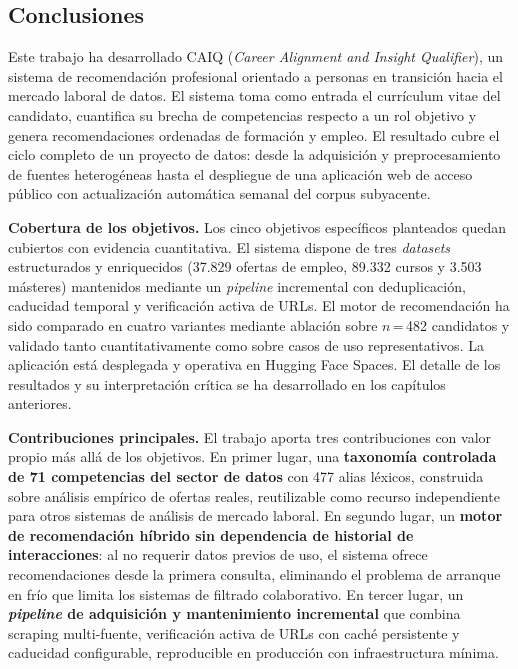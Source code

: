 
\subsection{Conclusiones}
\label{subsec:conclusiones}

Este trabajo ha desarrollado CAIQ (\textit{Career Alignment and Insight Qualifier}),
un sistema de recomendación profesional orientado a personas en transición hacia el
mercado laboral de datos. El sistema toma como entrada el currículum vitae del candidato,
cuantifica su brecha de competencias respecto a un rol objetivo y genera recomendaciones
ordenadas de formación y empleo. El resultado cubre el ciclo completo de un proyecto de
datos: desde la adquisición y preprocesamiento de fuentes heterogéneas hasta el despliegue
de una aplicación web de acceso público con actualización automática semanal del corpus
subyacente.

\textbf{Cobertura de los objetivos.} Los cinco objetivos específicos planteados quedan
cubiertos con evidencia cuantitativa. El sistema dispone de tres \textit{datasets}
estructurados y enriquecidos (37.829 ofertas de empleo, 89.332 cursos y 3.503 másteres)
mantenidos mediante un \textit{pipeline} incremental con deduplicación, caducidad
temporal y verificación activa de URLs. El motor de recomendación ha sido comparado en
cuatro variantes mediante ablación sobre $n$\,=\,482 candidatos y validado tanto
cuantitativamente como sobre casos de uso representativos. La aplicación está desplegada
y operativa en Hugging Face Spaces. El detalle de los resultados y su interpretación
crítica se ha desarrollado en los capítulos anteriores.

\textbf{Contribuciones principales.} El trabajo aporta tres contribuciones con valor
propio más allá de los objetivos. En primer lugar, una \textbf{taxonomía controlada de
71 competencias del sector de datos} con 477 alias léxicos, construida sobre análisis
empírico de ofertas reales, reutilizable como recurso independiente para otros sistemas
de análisis de mercado laboral. En segundo lugar, un \textbf{motor de recomendación
híbrido sin dependencia de historial de interacciones}: al no requerir datos previos de
uso, el sistema ofrece recomendaciones desde la primera consulta, eliminando el problema
de arranque en frío que limita los sistemas de filtrado colaborativo. En tercer lugar,
un \textbf{\textit{pipeline} de adquisición y mantenimiento incremental} que combina
scraping multi-fuente, verificación activa de URLs con caché persistente y caducidad
configurable, reproducible en producción con infraestructura mínima.

